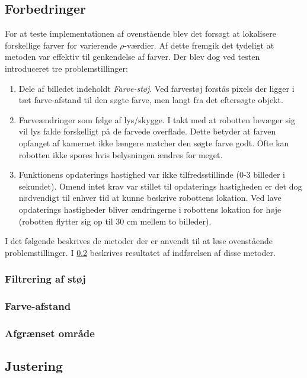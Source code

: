 \subsection{Forbedringer}
For at teste implementationen af ovenstående blev det forsøgt at lokalisere forskellige farver for varierende $\rho$-værdier.
Af dette fremgik det tydeligt at metoden var effektiv til genkendelse af farver.
Der blev dog ved testen introduceret tre problemstillinger:
\begin{enumerate}
\item Dele af billedet indeholdt \emph{Farve-støj}.
Ved farvestøj forstås pixels der ligger i tæt farve-afstand til den søgte farve, men langt fra det eftersøgte objekt.
\item Farveændringer som følge af lys/skygge.
I takt med at robotten bevæger sig vil lys falde forskelligt på de farvede overflade.
Dette betyder at farven opfanget af kameraet ikke længere matcher den søgte farve godt.
Ofte kan robotten ikke spores hvis belysningen ændres for meget.
\item Funktionens opdaterings hastighed var ikke tilfredsstillinde (0-3 billeder i sekundet).
Omend intet krav var stillet til opdaterings hastigheden er det dog nødvendigt til enhver tid at kunne beskrive robottens lokation.
Ved lave opdaterings hastigheder bliver ændringerne i robottens lokation for høje (robotten flytter sig op til 30 cm mellem to billeder).
\end{enumerate}

I det følgende beskrives de metoder der er anvendt til at løse ovenstående problemstillinger.
I \cref{tracking:adjust} beskrives resultatet af indførelsen af disse metoder.

\subsubsection{Filtrering af støj}

\subsubsection{Farve-afstand}

\subsubsection{Afgrænset område}

\subsection{Justering}\label{tracking:adjust}
